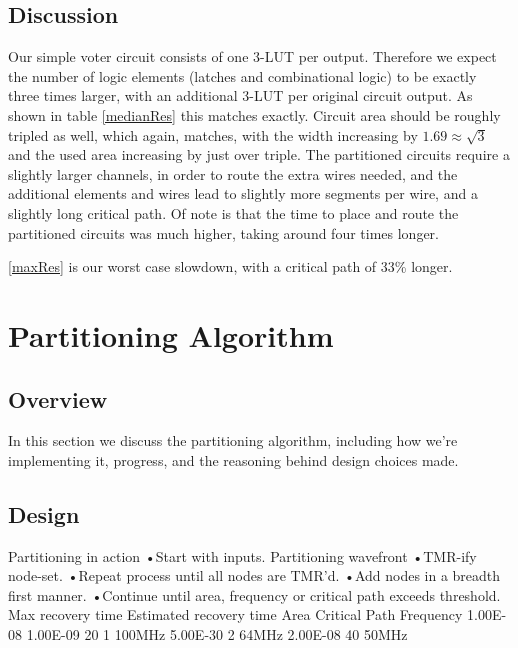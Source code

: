 \documentclass[12pt,draft,a4paper,oneside]{memoir} %
\begin{document}
\section{Discussion}
Our simple voter circuit consists of one 3-\ac{LUT} per output. Therefore we expect the number of logic elements (latches and combinational logic) to be exactly three times larger, with an additional 3-\ac{LUT} per original circuit output. As shown in table \ref{medianRes} this matches exactly. Circuit area should be roughly tripled as well, which again, matches, with the width increasing by $1.69 \approx \sqrt{3}$ and the used area increasing by just over triple. The partitioned circuits require a slightly larger channels, in order to route the extra wires needed, and the additional elements and wires lead to slightly more segments per wire, and a slightly long critical path. Of note is that the time to place and route the partitioned circuits was much higher, taking around four times longer.

\ref{maxRes} is our worst case slowdown, with a critical path of 33\% longer.



\chapter{Partitioning Algorithm}
\section{Overview}
In this section we discuss the partitioning algorithm, including how we're implementing it, progress, and the reasoning behind design choices made.
\section{Design}
Partitioning in action
•Start with inputs.
Partitioning wavefront
•TMR-ify node-set.
•Repeat process until all nodes are TMR’d.
•Add nodes in a breadth first manner.
•Continue until area, frequency or critical path exceeds threshold.
Max recovery time
Estimated recovery time
Area
Critical Path
Frequency
1.00E-08
1.00E-09
20
1
100MHz
5.00E-30
2
64MHz
2.00E-08
40
50MHz
\end{document}
